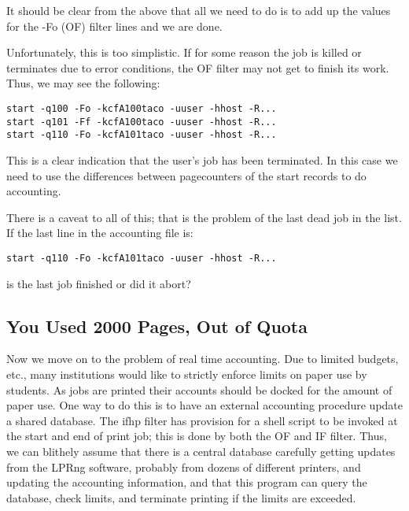 \documentclass[a4paper]{article}
\begin{document}
It should be clear from the above that all we need to do is to add up
the values for the -Fo (OF) filter lines and we are done.

Unfortunately,  this is too simplistic.  If for some reason the job is
killed or terminates due to error conditions,  the OF filter may not
get to finish its work.  Thus,  we may see the following:
\begin{tscreen}
\begin{verbatim}
start -q100 -Fo -kcfA100taco -uuser -hhost -R...  
start -q101 -Ff -kcfA100taco -uuser -hhost -R...  
start -q110 -Fo -kcfA101taco -uuser -hhost -R...
\end{verbatim}
\end{tscreen}


This is a clear indication that the user's job has been terminated.  In
this case we need to use the differences between pagecounters of the start
records to do accounting.

There is a caveat to all of this;  that is the problem of the last dead
job in the list.  If the last line in the accounting file is:
\begin{tscreen}
\begin{verbatim}
start -q110 -Fo -kcfA101taco -uuser -hhost -R...
\end{verbatim}
\end{tscreen}

is the last job finished or did it abort?


\subsection{You Used 2000 Pages, Out of Quota}

Now we move on to the problem of real time accounting.  Due to limited
budgets, etc., many institutions would like to strictly enforce limits
on paper use by students. As jobs are printed their accounts should be
docked for the amount of paper use.  One way to do this is to have an
external accounting procedure update a shared database.  The
ifhp
filter
has provision for a shell script to be invoked
at the start and end of print job;
this is done by both the OF and IF filter.  Thus, we can blithely
assume that there is a central database carefully getting updates
from the LPRng software, probably from dozens of different printers,
and updating the accounting information,
and that this program can query the database,
check limits,
and terminate printing if the limits are exceeded.
\end{document}
